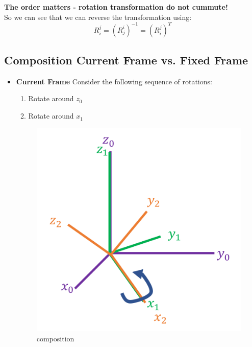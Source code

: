 \documentclass{article}
\begin{document}
\textbf{The order matters - rotation transformation do not cummute!}\\

So we can see that we can reverse the transformation using:
$$R^{j}_{i}=(R^{i}_{j})^{-1}=(R^{j}_{i})^{T} $$

\subsection{Composition Current Frame vs. Fixed Frame}
\begin{itemize}
    \item \textbf{Current Frame} Consider the following sequence of rotations:
    \begin{enumerate}
        \item Rotate around $z_0$
        \item Rotate around $x_1$
    \end{enumerate}
    \begin{figure}[h!]
    \centering
    \includegraphics[scale=1.5]{currentFrame.png}
    \caption{composition}
    \label{fig:sr}
    \end{figure}
    

\end{itemize}
\end{document}
